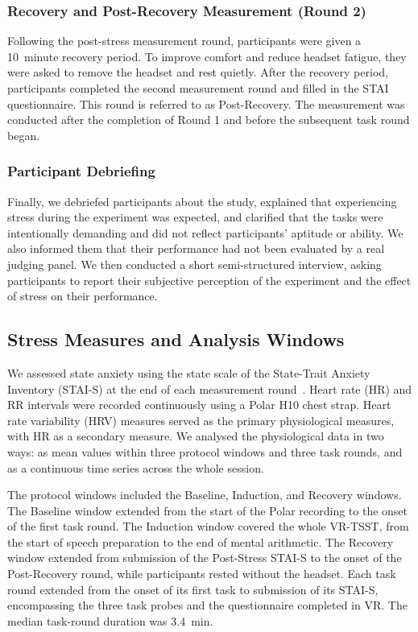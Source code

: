 \subsubsection{Recovery and Post-Recovery Measurement (Round 2)}
Following the post-stress measurement round, participants were given a 10~minute recovery period. To improve comfort and reduce headset fatigue, they were asked to remove the headset and rest quietly. After the recovery period, participants completed the second measurement round and filled in the STAI questionnaire. This round is referred to as Post-Recovery. The measurement was conducted after the completion of Round 1 and before the subsequent task round began.

\subsubsection{Participant Debriefing}
Finally, we debriefed participants about the study, explained that experiencing stress during the experiment was expected, and clarified that the tasks were intentionally demanding and did not reflect participants' aptitude or ability. We also informed them that their performance had not been evaluated by a real judging panel. We then conducted a short semi-structured interview, asking participants to report their subjective perception of the experiment and the effect of stress on their performance.

\subsection{Stress Measures and Analysis Windows}
\label{sec:stress-validation}

We assessed state anxiety using the state scale of the State-Trait Anxiety Inventory (STAI-S) at the end of each measurement round~\citep{spielberger1971state}. Heart rate (HR) and RR intervals were recorded continuously using a Polar H10 chest strap. Heart rate variability (HRV) measures served as the primary physiological measures, with HR as a secondary measure. We analysed the physiological data in two ways: as mean values within three protocol windows and three task rounds, and as a continuous time series across the whole session.

The protocol windows included the Baseline, Induction, and Recovery windows. The Baseline window extended from the start of the Polar recording to the onset of the first task round. The Induction window covered the whole VR-TSST, from the start of speech preparation to the end of mental arithmetic. The Recovery window extended from submission of the Post-Stress STAI-S to the onset of the Post-Recovery round, while participants rested without the headset. Each task round extended from the onset of its first task to submission of its STAI-S, encompassing the three task probes and the questionnaire completed in VR. The median task-round duration was 3.4~min.


